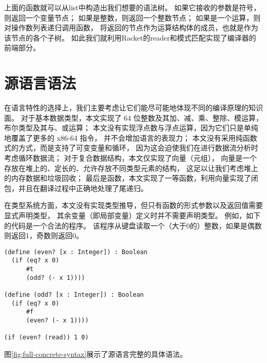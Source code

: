 上面的函数就可以从list中构造出我们想要的语法树。
如果它接收的参数是符号，则返回一个变量节点；
如果是整数，则返回一个整数节点；
如果是一个运算，则对操作数列表递归调用函数，
将返回的节点作为运算结构体的成员，也就是作为该节点的各个子树。
如此我们就利用Racket的reader和模式匹配实现了编译器的前端部分。

\section{源语言语法}

在语言特性的选择上，我们主要考虑让它们能尽可能地体现不同的编译原理的知识面。
对于基本数据类型，本文实现了 64 位整数及其加、减、乘、整除、模运算，布尔类型及其与、或运算；
本文没有实现浮点数与浮点运算，因为它们只是单纯地覆盖了更多的 x86-64 指令，
并不会增加语言的表现力；
本文没有采用纯函数式的方式，而是支持了可变变量和循环，
因为这会迫使我们在进行数据流分析时考虑循环数据流；
对于复合数据结构，本文仅实现了向量（元组），
向量是一个存放在堆上的、定长的、允许存放不同类型元素的结构，
这足以让我们考虑堆上的内存数据和垃圾回收；
最后是函数，本文实现了一等函数，利用向量实现了闭包，并且在翻译过程中正确地处理了尾递归。

在类型系统方面，本文没有实现类型推导，但只有函数的形式参数以及返回值需要显式声明类型，
其余变量（即局部变量）定义时并不需要声明类型。
例如，如下的代码是一个合法的程序。
该程序从键盘读取一个（大于0的）整数，如果是偶数则返回1，奇数则返回0。
\begin{lstlisting}
(define (even? [x : Integer]) : Boolean
  (if (eq? x 0)
      #t
      (odd? (- x 1))))

(define (odd? [x : Integer]) : Boolean
  (if (eq? x 0)
      #f
      (even? (- x 1))))

(if (even? (read)) 1 0)
\end{lstlisting}


图\ref{fig:full-concrete-syntax}展示了源语言完整的具体语法。



